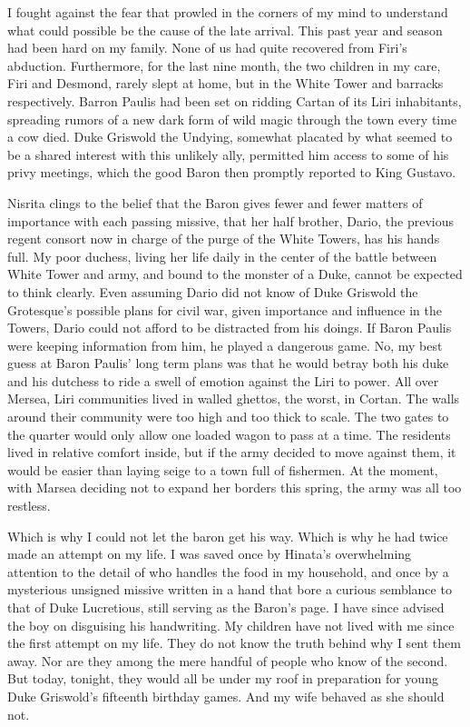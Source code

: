 \documentclass{article}
\begin{document}
I fought against the fear that prowled in the corners of my mind to understand what could possible be the cause of the late arrival. This past year and season had been hard on my family. None of us had quite recovered from Firi's abduction. Furthermore, for the last nine month, the two children in my care, Firi and Desmond, rarely slept at home, but in the White Tower and barracks respectively. Barron Paulis had been set on ridding Cartan of its Liri inhabitants, spreading rumors of a new dark form of wild magic through the town every time a cow died. Duke Griswold the Undying, somewhat placated by what seemed to be a shared interest with this unlikely ally, permitted him access to some of his privy meetings, which the good Baron then promptly reported to King Gustavo.

Nisrita clings to the belief that the Baron gives fewer and fewer matters of importance with each passing missive, that her half brother, Dario, the previous regent consort now in charge of the purge of the White Towers, has his hands full. My poor duchess, living her life daily in the center of the battle between White Tower and army, and bound to the monster of a Duke, cannot be expected to think clearly. Even assuming Dario did not know of Duke Griswold the Grotesque's possible plans for civil war, given importance and influence in the Towers, Dario could not afford to be distracted from his doings. If Baron Paulis were keeping information from him, he played a dangerous game. No, my best guess at Baron Paulis' long term plans was that he would betray both his duke and his dutchess to ride a swell of emotion against the Liri to power. All over Mersea, Liri communities lived in walled ghettos, the worst, in Cortan. The walls around their community were too high and too thick to scale. The two gates to the quarter would only allow one loaded wagon to pass at a time. The residents lived in relative comfort inside, but if the army decided to move against them, it would be easier than laying seige to a town full of fishermen. At the moment, with Marsea deciding not to expand her borders this spring, the army was all too restless.

Which is why I could not let the baron get his way. Which is why he had twice made an attempt on my life. I was saved once by Hinata's overwhelming attention to the detail of who handles the food in my household, and once by a mysterious unsigned missive written in a hand that bore a curious semblance to that of Duke Lucretious, still serving as the Baron's page. I have since advised the boy on disguising his handwriting. My children have not lived with me since the first attempt on my life. They do not know the truth behind why I sent them away. Nor are they among the mere handful of people who know of the second. But today, tonight, they would all be under my roof in preparation for young Duke Griswold's fifteenth birthday games. And my wife behaved as she should not.
\end{document}
